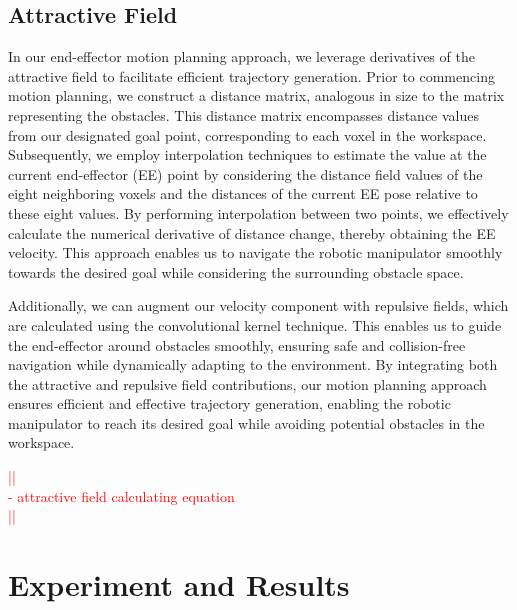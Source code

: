 \documentclass[a4paper]{article}
\newcommand\todocomment[1]{\textcolor{red}{||\\ #1\\||}}
\begin{document}
\subsection{Attractive Field}


In our end-effector motion planning approach, we leverage derivatives of the attractive field to facilitate efficient trajectory generation. Prior to commencing motion planning, we construct a distance matrix, analogous in size to the matrix representing the obstacles. This distance matrix encompasses distance values from our designated goal point, corresponding to each voxel in the workspace. Subsequently, we employ interpolation techniques to estimate the value at the current end-effector (EE) point by considering the distance field values of the eight neighboring voxels and the distances of the current EE pose relative to these eight values. By performing interpolation between two points, we effectively calculate the numerical derivative of distance change, thereby obtaining the EE velocity. This approach enables us to navigate the robotic manipulator smoothly towards the desired goal while considering the surrounding obstacle space.

Additionally, we can augment our velocity component with repulsive fields, which are calculated using the convolutional kernel technique. This enables us to guide the end-effector around obstacles smoothly, ensuring safe and collision-free navigation while dynamically adapting to the environment. By integrating both the attractive and repulsive field contributions, our motion planning approach ensures efficient and effective trajectory generation, enabling the robotic manipulator to reach its desired goal while avoiding potential obstacles in the workspace.

\todocomment{ - attractive field calculating equation }



\section{Experiment and Results}
	 	  
\end{document}

